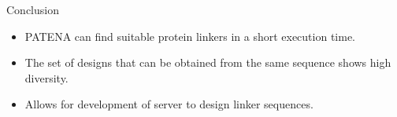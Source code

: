 \documentclass{beamer}
\begin{document}
\begin{frame}{Conclusion}
\begin{itemize}
 \item PATENA can find suitable protein linkers in a short execution time.
 \item The set of designs that can be obtained from the same sequence shows high diversity. 
 \item Allows for development of server to design linker sequences.
\end{itemize}
\end{frame}

































\end{document}
